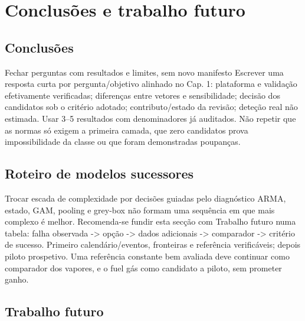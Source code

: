 
\chapter{Conclusões e trabalho futuro}
\label{cha:conclusoes}

\section{Conclusões}
\label{sec:conclusoes}
{Fechar perguntas com resultados e limites, sem novo manifesto}
{Escrever uma resposta curta por pergunta/objetivo alinhado no Cap. 1:
plataforma e validação efetivamente verificadas; diferenças entre
vetores e sensibilidade; decisão dos candidatos sob o critério adotado;
contributo/estado da revisão; deteção real não estimada.
Usar 3--5 resultados com denominadores já auditados. Não repetir que
as normas só exigem a primeira camada, que zero candidatos prova
impossibilidade da classe ou que foram demonstradas poupanças.}%



\section{Roteiro de modelos sucessores}
\label{sec:roteiro-modelos}
{Trocar escada de complexidade por decisões guiadas pelo diagnóstico}
{ARMA, estado, GAM, pooling e grey-box não formam uma sequência em que
mais complexo é melhor. Recomenda-se fundir esta secção com Trabalho
futuro numa tabela: falha observada -\textgreater{} opção -\textgreater{} dados adicionais -\textgreater{}
comparador -\textgreater{} critério de sucesso. Primeiro calendário/eventos,
fronteiras e referência verificáveis; depois piloto prospetivo.
Uma referência constante bem avaliada deve continuar como comparador
dos vapores, e o fuel gás como candidato a piloto, sem prometer ganho.}%



\section{Trabalho futuro}
\label{sec:trabalho-futuro}



